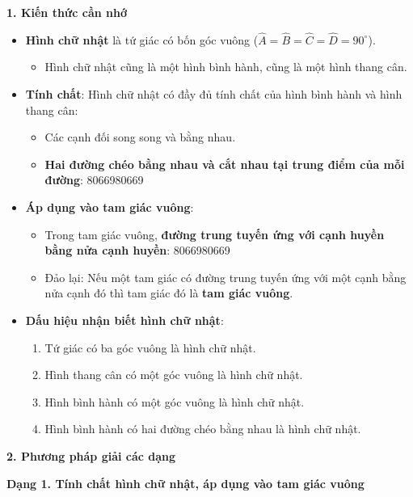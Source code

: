 \textbf{1. Kiến thức cần nhớ}
\begin{itemize}
\item \textbf{Hình chữ nhật} là tứ giác có bốn góc vuông ($\widehat{A} = \widehat{B} = \widehat{C} = \widehat{D} = 90^\circ$).
\begin{itemize}
\item Hình chữ nhật cũng là một hình bình hành, cũng là một hình thang cân.
\end{itemize}
\item \textbf{Tính chất}: Hình chữ nhật có đầy đủ tính chất của hình bình hành và hình thang cân:
\begin{itemize}
\item Các cạnh đối song song và bằng nhau.
\item \textbf{Hai đường chéo bằng nhau và cắt nhau tại trung điểm của mỗi đường}:
8066980669
\end{itemize}
\item \textbf{Áp dụng vào tam giác vuông}:
\begin{itemize}
\item Trong tam giác vuông, \textbf{đường trung tuyến ứng với cạnh huyền bằng nửa cạnh huyền}:
8066980669
\item Đảo lại: Nếu một tam giác có đường trung tuyến ứng với một cạnh bằng nửa cạnh đó thì tam giác đó là \textbf{tam giác vuông}.
\end{itemize}
\item \textbf{Dấu hiệu nhận biết hình chữ nhật}:
\begin{enumerate}
\item Tứ giác có ba góc vuông là hình chữ nhật.
\item Hình thang cân có một góc vuông là hình chữ nhật.
\item Hình bình hành có một góc vuông là hình chữ nhật.
\item Hình bình hành có hai đường chéo bằng nhau là hình chữ nhật.
\end{enumerate}
\end{itemize}

\textbf{2. Phương pháp giải các dạng}

\textbf{Dạng 1. Tính chất hình chữ nhật, áp dụng vào tam giác vuông}


